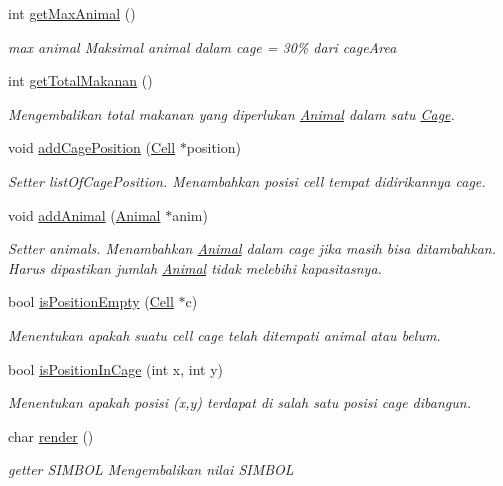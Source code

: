 \begin{DoxyCompactItemize}
int \hyperlink{classCage_ade3f9a83cbceecbc2f8b2d239d00ac7a}{get\-Max\-Animal} ()
\begin{DoxyCompactList}\small\item\em max animal Maksimal animal dalam cage = 30\% dari cage\-Area \end{DoxyCompactList}\item 
int \hyperlink{classCage_a5e5df3e1f60eb1e0577e11f12e73a659}{get\-Total\-Makanan} ()
\begin{DoxyCompactList}\small\item\em Mengembalikan total makanan yang diperlukan \hyperlink{classAnimal}{Animal} dalam satu \hyperlink{classCage}{Cage}. \end{DoxyCompactList}\item 
void \hyperlink{classCage_a45bf1594e9f1c25a7f85f08a2cab162f}{add\-Cage\-Position} (\hyperlink{classCell}{Cell} $\ast$position)
\begin{DoxyCompactList}\small\item\em Setter list\-Of\-Cage\-Position. Menambahkan posisi cell tempat didirikannya cage. \end{DoxyCompactList}\item 
void \hyperlink{classCage_ab2be8c3b1027d620ee0dbedbb9e5637d}{add\-Animal} (\hyperlink{classAnimal}{Animal} $\ast$anim)
\begin{DoxyCompactList}\small\item\em Setter animals. Menambahkan \hyperlink{classAnimal}{Animal} dalam cage jika masih bisa ditambahkan. Harus dipastikan jumlah \hyperlink{classAnimal}{Animal} tidak melebihi kapasitasnya. \end{DoxyCompactList}\item 
bool \hyperlink{classCage_adf86b9bd1da9aa59bf403320060bd455}{is\-Position\-Empty} (\hyperlink{classCell}{Cell} $\ast$c)
\begin{DoxyCompactList}\small\item\em Menentukan apakah suatu cell cage telah ditempati animal atau belum. \end{DoxyCompactList}\item 
bool \hyperlink{classCage_a72166ea7b4a83b59f54131b354272154}{is\-Position\-In\-Cage} (int x, int y)
\begin{DoxyCompactList}\small\item\em Menentukan apakah posisi (x,y) terdapat di salah satu posisi cage dibangun. \end{DoxyCompactList}\item 
char \hyperlink{classCage_aab864d541ada79ac83619b139bef5507}{render} ()
\begin{DoxyCompactList}\small\item\em getter S\-I\-M\-B\-O\-L Mengembalikan nilai S\-I\-M\-B\-O\-L \end{DoxyCompactList}\end{DoxyCompactItemize}


